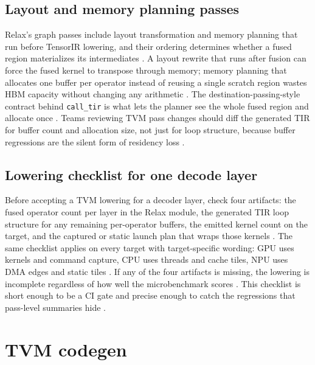 \subsection{Layout and memory planning passes}

Relax's graph passes include layout transformation and memory planning that run before TensorIR lowering, and their ordering determines whether a fused region materializes its intermediates \citep{lai2023relax,chen2020compilerbasedhardw}. A layout rewrite that runs after fusion can force the fused kernel to transpose through memory; memory planning that allocates one buffer per operator instead of reusing a single scratch region wastes HBM capacity without changing any arithmetic \citep{memoryfloor2026,lai2023relax}. The destination-passing-style contract behind \texttt{call\_tir} is what lets the planner see the whole fused region and allocate once \citep{lai2023relax}. Teams reviewing TVM pass changes should diff the generated TIR for buffer count and allocation size, not just for loop structure, because buffer regressions are the silent form of residency loss \citep{memoryfloor2026,patel2025llminference}.

\subsection{Lowering checklist for one decode layer}

Before accepting a TVM lowering for a decoder layer, check four artifacts: the fused operator count per layer in the Relax module, the generated TIR loop structure for any remaining per-operator buffers, the emitted kernel count on the target, and the captured or static launch plan that wraps those kernels \citep{chen2018tvm,nvidia2024cudagraphs,amd2024aie}. The same checklist applies on every target with target-specific wording: GPU uses kernels and command capture, CPU uses threads and cache tiles, NPU uses DMA edges and static tiles \citep{amd2024xdna,dlbook,nvidia2022hopper}. If any of the four artifacts is missing, the lowering is incomplete regardless of how well the microbenchmark scores \citep{taxbreak2026,memoryfloor2026}. This checklist is short enough to be a CI gate and precise enough to catch the regressions that pass-level summaries hide \citep{chen2020compilerbasedhardw,patel2025llminference}.

\section{TVM codegen}
\label{sec:ch16_tvm_codegen}

